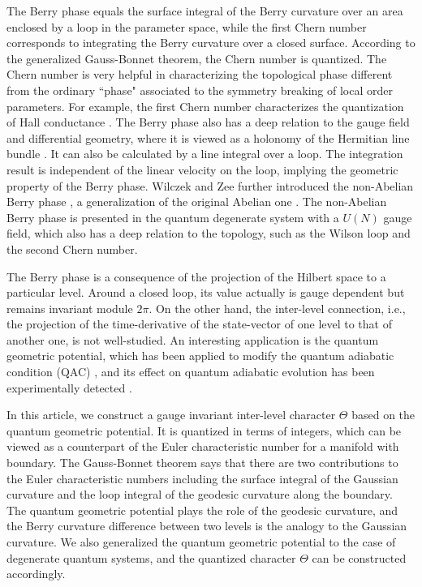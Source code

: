 \documentclass[aps,pra,twocolumn,groupedaddress,10pt]{revtex4}
\begin{document}
The Berry phase equals the surface integral of the Berry curvature
over an area enclosed by a loop in the parameter space, while the
first Chern number corresponds to integrating the Berry curvature
over a closed surface.
According to the generalized Gauss-Bonnet theorem, the Chern number
is quantized.
The Chern number is very helpful in characterizing the topological
phase different from the ordinary ``phase" associated to the
symmetry breaking of local order parameters.
For example, the first Chern number characterizes
the quantization of Hall conductance \cite{thouless1982quantized,kohmoto1985topological}.
The Berry phase also has a deep relation to
the gauge field and differential geometry,
where it is viewed as a holonomy of the Hermitian line bundle \cite{simon1983holonomy}.
It can also be calculated by a line integral over a loop.
The integration result is independent of the linear velocity on the loop,
implying the geometric property of the Berry phase.
Wilczek and Zee further introduced the non-Abelian Berry phase \cite{wilczek1984appearance}, a generalization of the original
Abelian one \cite{berry1984proc}.
The non-Abelian Berry phase is presented
in the quantum degenerate system with a $U(N)$ gauge field,
which also has a deep relation to the topology,
such as the Wilson loop \cite{PhysRevD.10.2445} and the second Chern number.

The Berry phase is a consequence of the projection of the Hilbert
space to a particular level.
Around a closed loop, its value actually is gauge dependent but
remains invariant module $2\pi$.
On the other hand, the inter-level connection, i.e.,
the projection of the time-derivative of the state-vector of
one level to that of another one, is not well-studied.
An interesting application is the quantum geometric potential,
which has been applied to modify the quantum adiabatic
condition (QAC) \cite{PhysRevA.77.062114}, and its effect on quantum
adiabatic evolution has been experimentally detected \cite{Du2008}.

In this article, we construct a gauge invariant inter-level character
$\Theta$ based on the quantum geometric potential.
It is quantized in terms of integers, which can be
viewed as a counterpart of the Euler characteristic number for a
manifold with boundary.
The Gauss-Bonnet theorem says that there are two contributions to
the Euler characteristic numbers including the surface integral
of the Gaussian curvature and the loop integral of the geodesic
curvature along the boundary.
The quantum geometric potential plays the role of
the geodesic curvature, and the Berry curvature difference
between two levels is the analogy to the Gaussian curvature.
We also generalized the quantum geometric potential to the
case of degenerate quantum systems, and the quantized
character $\Theta$ can be constructed accordingly.
\end{document}
